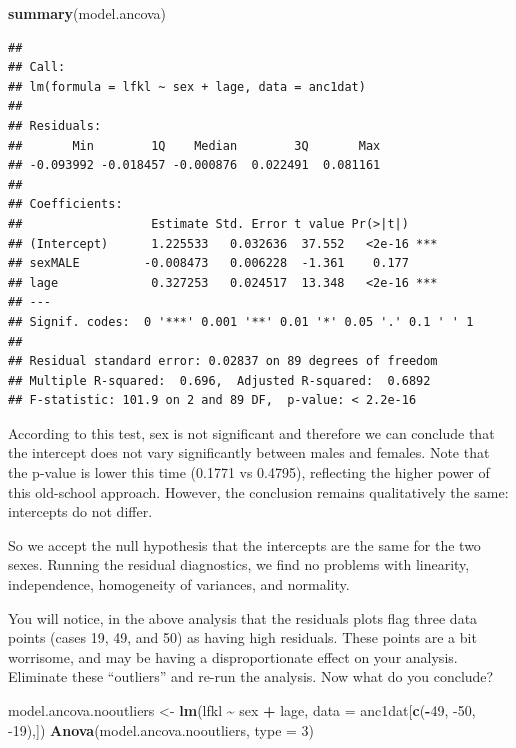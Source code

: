 \documentclass[
  12pt,
]{book}
\makeatletter
\newenvironment{Shaded}{\begin{snugshade}}{\end{snugshade}}
\newcommand{\DataTypeTok}[1]{\textcolor[rgb]{0.13,0.29,0.53}{#1}}
\newcommand{\DecValTok}[1]{\textcolor[rgb]{0.00,0.00,0.81}{#1}}
\newcommand{\KeywordTok}[1]{\textcolor[rgb]{0.13,0.29,0.53}{\textbf{#1}}}
\newcommand{\NormalTok}[1]{#1}
\newcommand{\OperatorTok}[1]{\textcolor[rgb]{0.81,0.36,0.00}{\textbf{#1}}}
\newcommand{\StringTok}[1]{\textcolor[rgb]{0.31,0.60,0.02}{#1}}
\newenvironment{kframe}{%
\medskip{}
\setlength{\fboxsep}{.8em}
\def\at@end@of@kframe{}%
\ifinner\ifhmode%
 \def\at@end@of@kframe{\end{minipage}}%
 \begin{minipage}{\columnwidth}%
\fi\fi%
\def\FrameCommand##1{\hskip\@totalleftmargin \hskip-\fboxsep
\colorbox{incolor}{##1}\hskip-\fboxsep
    \hskip-\linewidth \hskip-\@totalleftmargin \hskip\columnwidth}%
\MakeFramed {\advance\hsize-\width
  \@totalleftmargin\z@ \linewidth\hsize
  \@setminipage}}%
{\par\unskip\endMakeFramed%
\at@end@of@kframe}
\newenvironment{rmdblock}[1]
 {
 \begin{itemize}
 \renewcommand{\labelitemi}{
   \raisebox{-.7\height}[0pt][0pt]{
     {\setkeys{Gin}{width=3em,keepaspectratio}\texttt{[image: images/\#1]}}
   }
 }
 \begin{kframe}
 \setlength{\fboxsep}{1em}
 \item
 }
 {
 \end{kframe}
 \end{itemize}
 }
\newenvironment{rmdcode}
  {\begin{rmdblock}{screen}}
  {\end{rmdblock}}
\makeatother
\begin{document}
\begin{Shaded}
\begin{Highlighting}[]
\KeywordTok{summary}\NormalTok{(model.ancova)}
\end{Highlighting}
\end{Shaded}

\begin{verbatim}
## 
## Call:
## lm(formula = lfkl ~ sex + lage, data = anc1dat)
## 
## Residuals:
##       Min        1Q    Median        3Q       Max 
## -0.093992 -0.018457 -0.000876  0.022491  0.081161 
## 
## Coefficients:
##                  Estimate Std. Error t value Pr(>|t|)    
## (Intercept)      1.225533   0.032636  37.552   <2e-16 ***
## sexMALE         -0.008473   0.006228  -1.361    0.177    
## lage             0.327253   0.024517  13.348   <2e-16 ***
## ---
## Signif. codes:  0 '***' 0.001 '**' 0.01 '*' 0.05 '.' 0.1 ' ' 1
## 
## Residual standard error: 0.02837 on 89 degrees of freedom
## Multiple R-squared:  0.696,  Adjusted R-squared:  0.6892 
## F-statistic: 101.9 on 2 and 89 DF,  p-value: < 2.2e-16
\end{verbatim}

According to this test, sex is not significant and therefore we can conclude that the intercept does not vary significantly between males and females. Note that the p-value is lower this time (0.1771 vs 0.4795), reflecting the higher power of this old-school approach. However, the conclusion remains qualitatively the same: intercepts do not differ.

So we accept the null hypothesis that the intercepts are the same for the two sexes. Running the residual diagnostics, we find no problems with linearity, independence, homogeneity of variances, and normality.

\begin{rmdcode}
You will notice, in the above analysis that the residuals plots flag three data points (cases 19, 49, and 50) as having high residuals. These points are a bit worrisome, and may be having a disproportionate effect on your analysis. Eliminate these ``outliers'' and re-run the analysis. Now what do you conclude?
\end{rmdcode}

\begin{Shaded}
\begin{Highlighting}[]
\NormalTok{model.ancova.nooutliers \textless{}{-}}\StringTok{ }\KeywordTok{lm}\NormalTok{(lfkl }\OperatorTok{\textasciitilde{}}\StringTok{ }\NormalTok{sex }\OperatorTok{+}\StringTok{ }\NormalTok{lage, }\DataTypeTok{data =}\NormalTok{ anc1dat[}\KeywordTok{c}\NormalTok{(}\OperatorTok{{-}}\DecValTok{49}\NormalTok{, }\DecValTok{{-}50}\NormalTok{, }\DecValTok{{-}19}\NormalTok{),])}
\KeywordTok{Anova}\NormalTok{(model.ancova.nooutliers, }\DataTypeTok{type =} \DecValTok{3}\NormalTok{)}
\end{Highlighting}
\end{Shaded}
\end{document}
